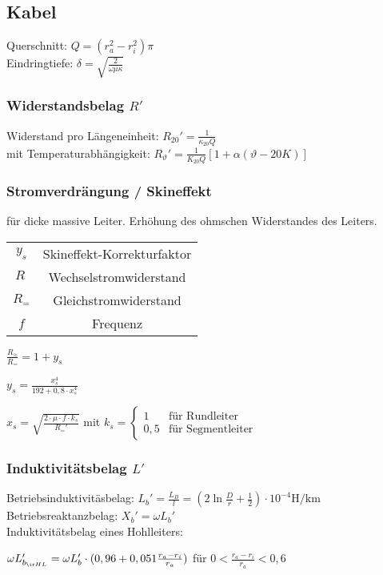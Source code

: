 \documentclass[german]{latex4ei/latex4ei_sheet}
\begin{document}
\begin{sectionbox}
\subsection{Kabel}

Querschnitt: $Q = (r_a^2 - r_i^2) \pi$ \\

Eindringtiefe: $\delta = \sqrt{\frac{2}{\omega \mu \kappa}}$

\subsubsection{Widerstandsbelag $R'$}

Widerstand pro Längeneinheit: $R_{20}' =  \frac{1}{\kappa_{20} Q}$ \\
mit Temperaturabhängigkeit: $R_{\vartheta}'= \frac{1}{K_{20} Q} \left[ 1+ \alpha ( \vartheta - 20 K) \right]$\\

\subsubsection*{Stromverdrängung / Skineffekt}
für dicke massive Leiter. Erhöhung des ohmschen Widerstandes des Leiters.
\begin{symbolbox}
	\begin{tabular}{cc}
	$y_s$ &  Skineffekt-Korrekturfaktor \\
	$R_{~}$ & Wechselstromwiderstand \\
	$R_{=}$ & Gleichstromwiderstand \\
	$f$ & Frequenz
	\end{tabular}
\end{symbolbox}

$\frac{R_{\approx}}{R_{=}} = 1 + y_s$

$y_s = \frac{x_s^4}{192 + 0,8 \cdot x_s^4}$

$x_s = \sqrt{\frac{2 \cdot \mu \cdot f \cdot k_s}{R_{=}'}} $ mit $k_s = \begin{cases}
1 & \text{für Rundleiter} \\ 0,5 & \text{für Segmentleiter}
\end{cases}$
\subsubsection{Induktivitätsbelag $L'$}
Betriebsinduktivitäsbelag: $L_b' = \frac{L_B}{l} = \left( 2 \ln \frac{D}{r}+ \frac{1}{2} \right) \cdot 10^{-4} \si{\henry \per \kilo \meter}$ \\

Betriebsreaktanzbelag: $X_b ' = \omega	L_b ' $ \\

Induktivitätsbelag eines Hohlleiters:

$\omega L_{b_{\ir HL}}' = \omega L_{b}' \cdot ( 0,96 + 0,051 \frac{r_a - r_i}{r_a})$ für $0 < \frac{r_a - r_i}{r_a} < 0,6$
\\
\end{sectionbox}
\end{document}
